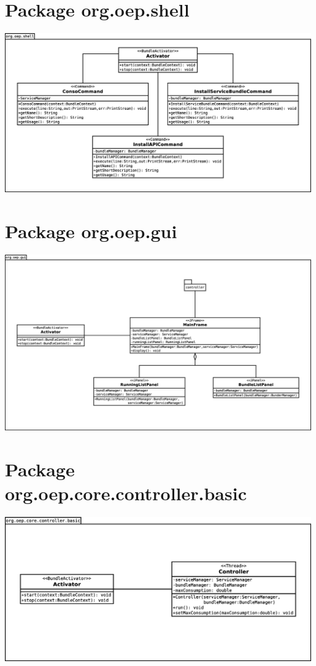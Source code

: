 \documentclass[a4paper, 11pt]{report}
\begin{document}
\section{Package org.oep.shell}
	\begin{centering}
		\includegraphics[width=0.99\textwidth]{figures/EcoPattern_Shell_Classes.eps}
	\end{centering}
\section{Package org.oep.gui}
	\begin{centering}
		\includegraphics[width=0.99\textwidth]{figures/EcoPattern_Gui_Classes.eps}
	\end{centering}
\section{Package org.oep.core.controller.basic}
	\begin{centering}
		\includegraphics[width=0.99\textwidth]{figures/EcoPattern_Controller_Basic_Classes.eps}
	\end{centering}
\end{document}
